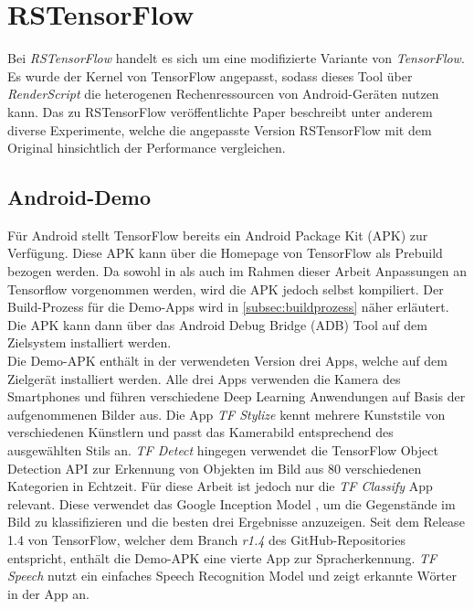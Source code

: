 \section{RSTensorFlow}
\label{sec:rstensorflow}
Bei \textit{RSTensorFlow} handelt es sich um eine modifizierte Variante von \textit{TensorFlow}. Es wurde der Kernel von TensorFlow angepasst, sodass dieses Tool über \textit{RenderScript} die heterogenen Rechenressourcen von Android-Geräten nutzen kann. Das zu RSTensorFlow veröffentlichte Paper \cite{rstensorflow2017} beschreibt unter anderem diverse Experimente, welche die angepasste Version RSTensorFlow mit dem Original hinsichtlich der Performance vergleichen. 

\subsection{Android-Demo}
\label{subsec:androiddemo}
Für Android stellt TensorFlow bereits ein Android Package Kit (APK) zur Verfügung. Diese APK kann über die Homepage von TensorFlow \cite{tensorflow} als Prebuild bezogen werden. Da sowohl in \cite{rstensorflow2017} als auch im Rahmen dieser Arbeit Anpassungen an Tensorflow vorgenommen werden, wird die APK jedoch selbst kompiliert. Der Build-Prozess für die Demo-Apps wird in \ref{subsec:buildprozess} näher erläutert. Die APK kann dann über das Android Debug Bridge (ADB) Tool auf dem Zielsystem installiert werden. 
\\
Die Demo-APK enthält in der verwendeten Version drei Apps, welche auf dem Zielgerät installiert werden. Alle drei Apps verwenden die Kamera des Smartphones und führen verschiedene Deep Learning Anwendungen auf Basis der aufgenommenen Bilder aus. Die App \textit{TF Stylize} kennt mehrere Kunststile von verschiedenen Künstlern und passt das Kamerabild entsprechend des ausgewählten Stils an. \textit{TF Detect} hingegen verwendet die TensorFlow Object Detection API zur Erkennung von Objekten im Bild aus 80 verschiedenen Kategorien in Echtzeit. Für diese Arbeit ist jedoch nur die \textit{TF Classify} App relevant. Diese verwendet das Google Inception Model \cite{googleinception}, um die Gegenstände im Bild zu klassifizieren und die besten drei Ergebnisse anzuzeigen. 
Seit dem Release 1.4 von TensorFlow, welcher dem Branch \textit{r1.4} des GitHub-Repositories \cite{tensorflowgithub} entspricht, enthält die Demo-APK eine vierte App zur Spracherkennung. \textit{TF Speech} nutzt ein einfaches Speech Recognition Model und zeigt erkannte Wörter in der App an.

